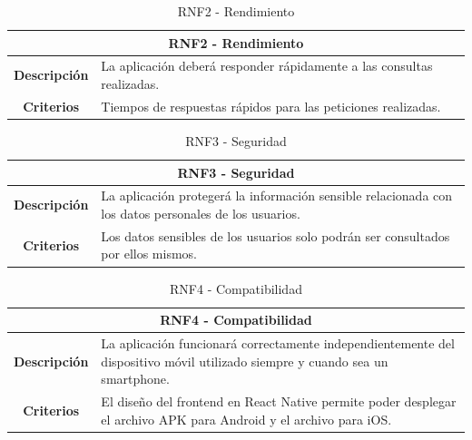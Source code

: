 \begin{table}[H]
    \centering
    \begin{tabular}{|c|p{10cm}|}
        \hline
        \multicolumn{2}{|c|}{\textbf{RNF2 - Rendimiento}}                                             \\
        \hline
        \textbf{Descripción} & La aplicación deberá responder rápidamente a las consultas realizadas. \\
        \hline
        \textbf{Criterios}   & Tiempos de respuestas rápidos para las peticiones realizadas.          \\
        \hline
    \end{tabular}
    \caption{RNF2 - Rendimiento}
\end{table}

\begin{table}[H]
    \centering
    \begin{tabular}{|c|p{10cm}|}
        \hline
        \multicolumn{2}{|c|}{\textbf{RNF3 - Seguridad}}                                                                              \\
        \hline
        \textbf{Descripción} & La aplicación protegerá la información sensible relacionada con los datos personales de los usuarios. \\
        \hline
        \textbf{Criterios}   & Los datos sensibles de los usuarios solo podrán ser consultados por ellos mismos.                     \\
        \hline
    \end{tabular}
    \caption{RNF3 - Seguridad}
\end{table}

\begin{table}[H]
    \centering
    \begin{tabular}{|c|p{10cm}|}
        \hline
        \multicolumn{2}{|c|}{\textbf{RNF4 - Compatibilidad}}                                                                                                 \\
        \hline
        \textbf{Descripción} & La aplicación funcionará correctamente independientemente del dispositivo móvil utilizado siempre y cuando sea un smartphone. \\
        \hline
        \textbf{Criterios}   & El diseño del frontend en React Native permite poder desplegar el archivo APK para Android y el archivo para iOS.             \\
        \hline
    \end{tabular}
    \caption{RNF4 - Compatibilidad}
\end{table}


